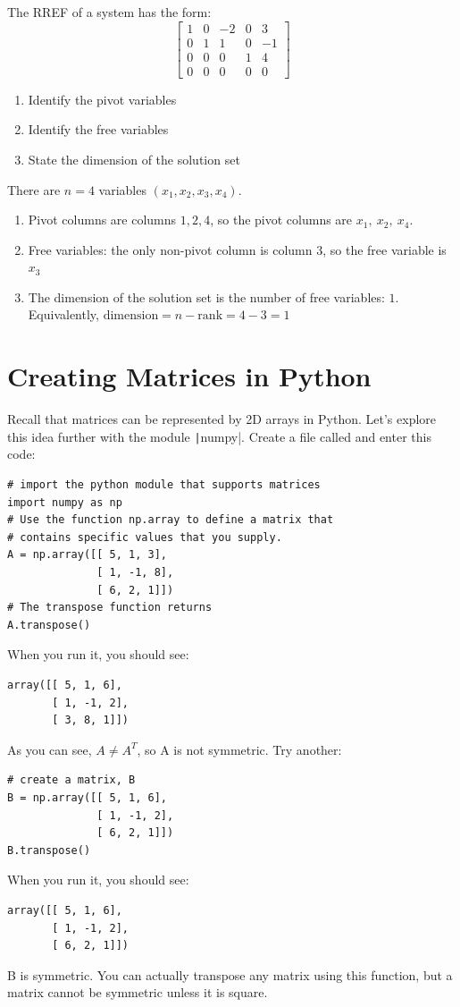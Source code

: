 \begin{Exercise}[title=Free Variables,label=free1]
The RREF of a system has the form:
$$\begin{bmatrix}
1&0&-2&0&3\\
0&1&1&0&-1\\
0&0&0&1&4\\
0&0&0&0&0
\end{bmatrix}$$
\begin{enumerate}
       \item Identify the pivot variables
       \item Identify the free variables
       \item State the dimension of the solution set
\end{enumerate}
\end{Exercise}
\begin{Answer}[ref=free1]
There are $n=4$ variables $(x_1,x_2,x_3,x_4)$. 
\begin{enumerate}
       \item Pivot columns are columns $1,2,4$, so the pivot columns are $x_1,\ x_2,\ x_4$. 
       \item Free variables: the only non-pivot column is column $3$, so the free variable is $x_3$
       \item The dimension of the solution set is the number of free variables: $1$. Equivalently, $\text{dimension}=n-\text{rank}=4-3=1$
\end{enumerate}
\end{Answer}
\section{Creating Matrices in Python}
Recall that matrices can be represented by 2D arrays in Python. Let's explore this idea further with the module \texttt|numpy|. Create a file called  and enter this code:
\begin{verbatim}
# import the python module that supports matrices
import numpy as np
# Use the function np.array to define a matrix that 
# contains specific values that you supply.
A = np.array([[ 5, 1, 3], 
              [ 1, -1, 8], 
              [ 6, 2, 1]])
# The transpose function returns 
A.transpose()
\end{verbatim}
When you run it, you should see:
\begin{verbatim}
array([[ 5, 1, 6], 
       [ 1, -1, 2], 
       [ 3, 8, 1]])
\end{verbatim}
As you can see, $A\neq A^T$, so A is not symmetric.
Try another: 
\begin{verbatim}
# create a matrix, B
B = np.array([[ 5, 1, 6], 
              [ 1, -1, 2], 
              [ 6, 2, 1]])
B.transpose()
\end{verbatim}
When you run it, you should see:
\begin{verbatim}
array([[ 5, 1, 6], 
       [ 1, -1, 2], 
       [ 6, 2, 1]])
\end{verbatim}
B is symmetric. You can actually transpose any matrix using this function, but a matrix cannot be symmetric unless it is square. 

